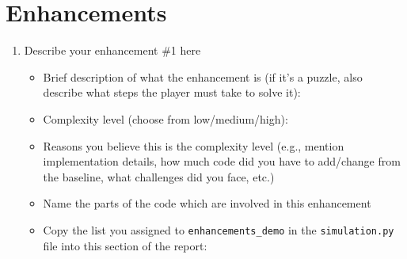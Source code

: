 \documentclass[11pt]{article}
\begin{document}
\section*{Enhancements}
\begin{enumerate}
    \item Describe your enhancement \#1 here
    \begin{itemize}
        \item Brief description of what the enhancement is (if it's a puzzle, also describe what steps the player must take to solve it):
        \item Complexity level (choose from low/medium/high):
        \item Reasons you believe this is the complexity level (e.g., mention implementation details, how much code did you have to add/change from the baseline, what challenges did you face, etc.)
        \item Name the parts of the code which are involved in this enhancement
        \item Copy the list you assigned to \texttt{enhancements\_demo} in the \texttt{simulation.py} file into this section of the report:
    \end{itemize}

\end{enumerate}
\end{document}
